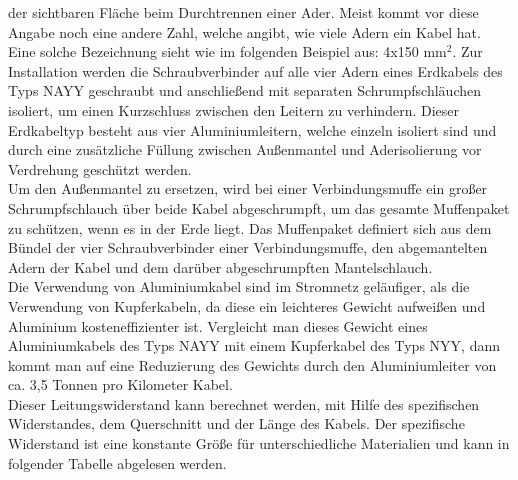 der sichtbaren Fläche beim Durchtrennen einer Ader. Meist kommt vor diese Angabe noch eine andere Zahl, welche angibt, wie viele Adern ein Kabel hat. Eine 
solche Bezeichnung sieht wie im folgenden Beispiel aus: 4x150 $\text{mm}^2$. Zur Installation werden die Schraubverbinder auf alle vier Adern eines Erdkabels des 
Typs NAYY geschraubt und anschließend mit separaten Schrumpfschläuchen isoliert, um einen Kurzschluss zwischen den Leitern zu verhindern. Dieser Erdkabeltyp 
besteht aus vier Aluminiumleitern, welche einzeln isoliert sind und durch eine zusätzliche Füllung zwischen Außenmantel und Aderisolierung vor Verdrehung 
geschützt werden. \autocite{NKT_NAYY}
\\
Um den Außenmantel zu ersetzen, wird bei einer Verbindungsmuffe ein großer Schrumpfschlauch über beide Kabel abgeschrumpft, um das gesamte Muffenpaket zu 
schützen, wenn es in der Erde liegt. Das Muffenpaket definiert sich aus dem Bündel der vier Schraubverbinder einer Verbindungsmuffe, den abgemantelten Adern 
der Kabel und dem darüber abgeschrumpften Mantelschlauch. \autocite{Cellpack}
\\
Die Verwendung von Aluminiumkabel sind im Stromnetz geläufiger, als die Verwendung von Kupferkabeln, da diese ein leichteres Gewicht aufweißen und Aluminium 
kosteneffizienter ist. Vergleicht man dieses Gewicht eines Aluminiumkabels des Typs NAYY mit einem Kupferkabel des Typs NYY, dann kommt man auf eine 
Reduzierung des Gewichts durch den Aluminiumleiter von ca. 3,5 Tonnen pro Kilometer Kabel. \autocite{NKT_NYY}
\\
Dieser Leitungswiderstand kann berechnet werden, mit Hilfe des spezifischen Widerstandes, dem Querschnitt und der Länge des Kabels. 
\clearpage
Der spezifische Widerstand ist eine konstante Größe für unterschiedliche Materialien und kann in folgender Tabelle abgelesen werden.
